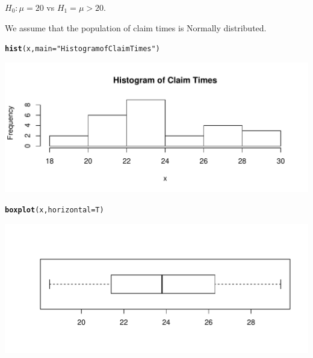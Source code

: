 \documentclass[t,xcolor=pdftex,dvipsnames,table]{beamer}
\makeatletter
\def\maxwidth{ %
  \ifdim\Gin@nat@width>\linewidth
    \linewidth
  \else
    \Gin@nat@width
  \fi
}
\newcommand{\hlstr}[1]{\textcolor[rgb]{0.192,0.494,0.8}{#1}}%
\newcommand{\hlstd}[1]{\textcolor[rgb]{0.345,0.345,0.345}{#1}}%
\newcommand{\hlkwc}[1]{\textcolor[rgb]{0.333,0.667,0.333}{#1}}%
\newcommand{\hlkwd}[1]{\textcolor[rgb]{0.737,0.353,0.396}{\textbf{#1}}}%
\newenvironment{kframe}{%
 \def\at@end@of@kframe{}%
 \ifinner\ifhmode%
  \def\at@end@of@kframe{\end{minipage}}%
  \begin{minipage}{\columnwidth}%
 \fi\fi%
 \def\FrameCommand##1{\hskip\@totalleftmargin \hskip-\fboxsep
 \colorbox{shadecolor}{##1}\hskip-\fboxsep
     \hskip-\linewidth \hskip-\@totalleftmargin \hskip\columnwidth}%
 \MakeFramed {\advance\hsize-\width
   \@totalleftmargin\z@ \linewidth\hsize
   \@setminipage}}%
 {\par\unskip\endMakeFramed%
 \at@end@of@kframe}
\newenvironment{knitrout}{}{} %
\makeatother
\begin{document}
\begin{frame}[fragile]{}

$H_{0}: \mu = 20$ vs $H_{1} = \mu > 20$.

\vspace{.5cm}
 We assume that the population of claim times is Normally distributed.

\begin{knitrout}
\color{fgcolor}\begin{kframe}
\begin{alltt}
\hlkwd{hist}\hlstd{(x,}\hlkwc{main}\hlstd{=}\hlstr{"Histogram of Claim Times"}\hlstd{)}
\end{alltt}
\end{kframe}
\includegraphics[width=\maxwidth]{figure/unnamed-chunk-6-1} 

\end{knitrout}
\end{frame}  

\begin{frame}[fragile]{}

\begin{knitrout}
\color{fgcolor}\begin{kframe}
\begin{alltt}
\hlkwd{boxplot}\hlstd{(x,}\hlkwc{horizontal}\hlstd{=T)}
\end{alltt}
\end{kframe}
\includegraphics[width=\maxwidth]{figure/unnamed-chunk-7-1} 

\end{knitrout}
\end{frame}  
\end{document}
